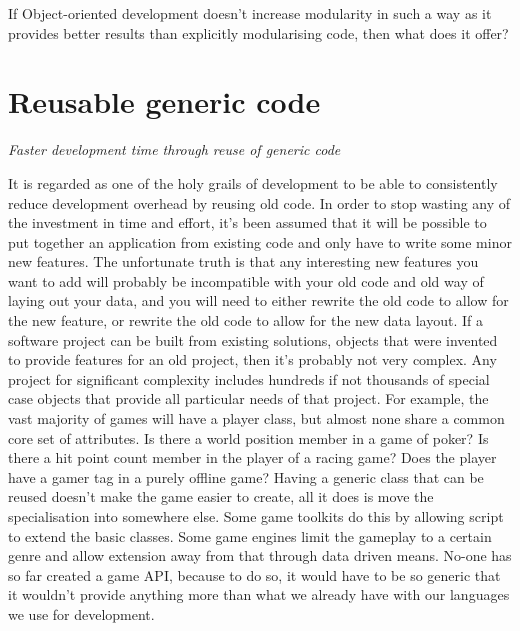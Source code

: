 If Object-oriented development doesn't increase modularity in such a way as it
provides better results than explicitly modularising code, then what does it
offer?

\section{Reusable generic code}
\emph{Faster development time through reuse of
generic code} \\ \hfill

It is regarded as one of the holy grails of development to be able to
consistently reduce development overhead by reusing old code. In order to stop
wasting any of the investment in time and effort, it's been assumed that it
will be possible to put together an application from existing code and only
have to write some minor new features. The unfortunate truth is that any
interesting new features you want to add will probably be incompatible with
your old code and old way of laying out your data, and you will need to either
rewrite the old code to allow for the new feature, or rewrite the old code to
allow for the new data layout. If a software project can be built from existing
solutions, objects that were invented to provide features for an old project,
then it's probably not very complex. Any project for significant complexity
includes hundreds if not thousands of special case objects that provide all
particular needs of that project. For example, the vast majority of games will
have a player class, but almost none share a common core set of attributes. Is
there a world position member in a game of poker? Is there a hit point count
member in the player of a racing game? Does the player have a gamer tag in a
purely offline game? Having a generic class that can be reused doesn't make the
game easier to create, all it does is move the specialisation into somewhere
else. Some game toolkits do this by allowing script to extend the basic
classes. Some game engines limit the gameplay to a certain genre and allow
extension away from that through data driven means. No-one has so far created a
game API, because to do so, it would have to be so generic that it wouldn't
provide anything more than what we already have with our languages we use for
development.

